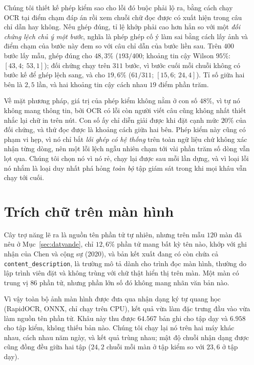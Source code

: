 \documentclass[12pt,a4paper,onecolumn]{article}
\newcommand{\ôvuông}[2]{\tikz[baseline=-0.45ex]{\draw[#1,line width=0.9pt,#2] (0,0) rectangle (0.34,0.18);}}
\newcommand{\code}[1]{{\small\texttt{#1}}}
\begin{document}
Chúng tôi thiết kế phép kiểm sao cho lỗi đó buộc phải lộ ra, bằng cách chạy OCR tại điểm
chạm đáp án rồi xem chuỗi chữ đọc được có xuất hiện trong câu chỉ dẫn hay không. Nếu ghép đúng, tỉ lệ khớp phải cao
hơn hẳn so với một \emph{đối chứng lệch chủ ý một bước}, nghĩa là phép ghép cố ý làm sai bằng cách lấy ảnh và điểm chạm của bước này đem so với câu chỉ dẫn của bước liền sau. Trên $400$
bước lấy mẫu, ghép đúng cho $48{,}3\%$ ($193/400$; khoảng tin cậy Wilson $95\%$:
$[43{,}4;\ 53{,}1]$); đối chứng chạy trên $311$ bước, vì bước cuối mỗi chuỗi không có bước
kế để ghép lệch sang, và cho $19{,}6\%$ ($61/311$; $[15{,}6;\ 24{,}4]$). Tỉ số giữa hai bên là $2{,}5$ lần, và hai khoảng tin cậy cách nhau $19$ điểm phần trăm.

Về mặt phương pháp, giá trị của phép kiểm không nằm ở con số $48\%$, vì tự nó không mang
thông tin, bởi OCR có lỗi còn người viết câu cũng không nhất thiết nhắc lại chữ in trên
nút. Con số ấy chỉ diễn giải được khi đặt cạnh mức $20\%$ của đối chứng, và thứ đọc được là
khoảng cách giữa hai bên. Phép kiểm này cũng có phạm vi hẹp, vì nó chỉ bắt \emph{lỗi ghép
có hệ thống} trên toàn ngữ liệu chứ không xác nhận từng dòng, nên một lỗi lệch ngẫu nhiên
chạm tới vài phần trăm số dòng vẫn lọt qua. Chúng tôi chọn nó vì nó rẻ, chạy lại được sau mỗi lần dựng, và vì
loại lỗi nó nhắm là loại duy nhất phá hỏng \emph{toàn bộ} tập giám sát trong khi mọi khâu
vẫn chạy tới cuối.

\section{Trích chữ trên màn hình}
\label{sec:ocr}

Cây trợ năng lẽ ra là nguồn tên phần tử tự nhiên, nhưng trên mẫu $120$ màn đã nêu ở Mục~\ref{sec:datvande}, chỉ $12{,}6\%$ phần tử mang bất
kỳ tên nào, khớp với ghi nhận của Chen và cộng sự (2020), và
bản kết xuất đang có còn chứa cả \code{content\_\allowbreak description}, là trường mô tả dành cho trình đọc màn hình, thường do lập trình viên đặt và không trùng với chữ thật
hiển thị trên màn. Một màn có trung vị $86$ phần tử, nhưng phần lớn số đó không mang nhãn
văn bản nào.

Vì vậy toàn bộ ảnh màn hình được đưa qua nhận dạng ký tự quang học (RapidOCR, ONNX, chỉ
chạy trên CPU), kết quả vừa làm đặc trưng đầu vào vừa làm nguồn tên phần tử. Khâu này thu được $64.567$
bản ghi cho tập dạy và $6.958$ cho tập kiểm, không thiếu bản nào. Chúng tôi chạy lại nó
trên hai máy khác nhau, cách nhau năm ngày, và kết quả trùng nhau; mật độ chuỗi nhận dạng được cũng đồng đều giữa hai tập
($24{,}2$ chuỗi mỗi màn ở tập kiểm so với $23{,}6$ ở tập dạy).
\end{document}

